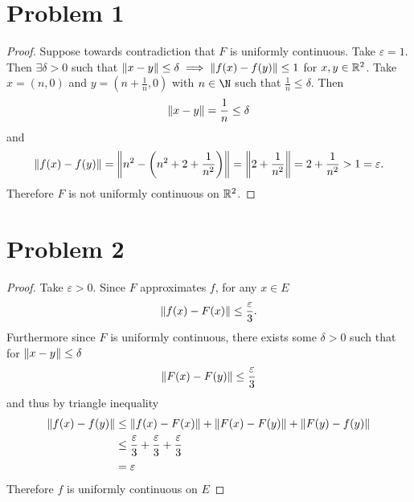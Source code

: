 \documentclass{eeleyes}
\newcommand\eps{\varepsilon}
\begin{document}
\section*{Problem 1}
\begin{proof}
    Suppose towards contradiction that $F$ is uniformly continuous. Take $\eps = 1$. Then $\exists \delta > 0$ such that $\norm{x - y} \leq \delta \implies \norm{f(x) - f(y)} \leq 1$ for $x,y \in \mathbb{R}^2$. Take $x = (n, 0)$ and $y = (n + \frac{1}{n}, 0)$ with $n \in \N$ such that $\frac{1}{n} \leq \delta$. Then
    \[
        \norm{x - y} = \frac{1}{n} \leq \delta
    \]
    and
    \[
        \norm{f(x) - f(y)} = \norm{n^2 - \qty(n^2 + 2 + \frac{1}{n^2})} = \norm{2 + \frac{1}{n^2}} = 2 + \frac{1}{n^2} > 1 = \eps
    .\]
    Therefore $F$ is not uniformly continuous on $\mathbb{R}^2$.
\end{proof}

\section*{Problem 2}
\begin{proof}
    Take $\eps > 0$. Since $F$ approximates $f$, for any $x \in E$
    \[
        \norm{f(x) - F(x)} \leq \frac{\eps}{3}
    .\]
    Furthermore since $F$ is uniformly continuous, there exists some $\delta > 0$ such that for $\norm{x - y} \leq \delta$
    \[
        \norm{F(x) - F(y)} \leq \frac{\eps}{3}
    \]
    and thus by triangle inequality
    \begin{align*}
        \norm{f(x) - f(y)} &\leq \norm{f(x) - F(x)} + \norm{F(x) - F(y)} + \norm{F(y) - f(y)}  \\
        &\leq \frac{\eps}{3} + \frac{\eps}{3} + \frac{\eps}{3} \\
        &= \eps
    \end{align*}
    Therefore $f$ is uniformly continuous on $E$
\end{proof}
\end{document}
